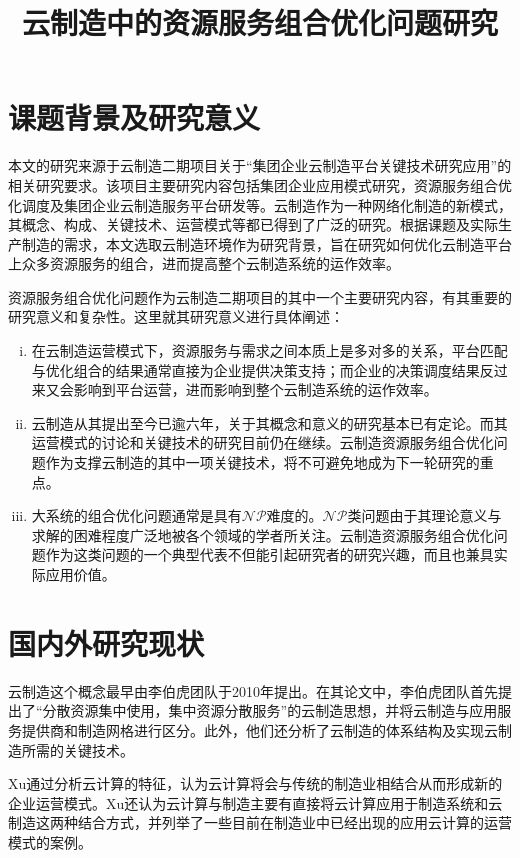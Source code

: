 \documentclass[UTF8]{ctexart}
\title{云制造中的资源服务组合优化问题研究}
\begin{document}
\maketitle
\section{课题背景及研究意义}
\label{background}
本文的研究来源于云制造二期项目关于“集团企业云制造平台关键技术研究应用”的相关研究要求。该项目主要研究内容包括集团企业应用模式研究，资源服务组合优化调度及集团企业云制造服务平台研发等。云制造作为一种网络化制造的新模式，其概念、构成、关键技术、运营模式等都已得到了广泛的研究。根据课题及实际生产制造的需求，本文选取云制造环境作为研究背景，旨在研究如何优化云制造平台上众多资源服务的组合，进而提高整个云制造系统的运作效率。

资源服务组合优化问题作为云制造二期项目的其中一个主要研究内容，有其重要的研究意义和复杂性。这里就其研究意义进行具体阐述：
\begin{enumerate}[(i)]
\item 在云制造运营模式下，资源服务与需求之间本质上是多对多的关系，平台匹配与优化组合的结果通常直接为企业提供决策支持；而企业的决策调度结果反过来又会影响到平台运营，进而影响到整个云制造系统的运作效率。
\item 云制造从其提出至今已逾六年，关于其概念和意义的研究基本已有定论。而其运营模式的讨论和关键技术的研究目前仍在继续。云制造资源服务组合优化问题作为支撑云制造的其中一项关键技术，将不可避免地成为下一轮研究的重点。
\item 大系统的组合优化问题通常是具有$\mathcal{NP}$难度的。$\mathcal{NP}$类问题由于其理论意义与求解的困难程度广泛地被各个领域的学者所关注。云制造资源服务组合优化问题作为这类问题的一个典型代表不但能引起研究者的研究兴趣，而且也兼具实际应用价值。
\end{enumerate}

\section{国内外研究现状}
\label{present research situation}
云制造这个概念最早由李伯虎团队\cite{LiBohu2010}于2010年提出。在其论文中，李伯虎团队首先提出了“分散资源集中使用，集中资源分散服务”的云制造思想，并将云制造与应用服务提供商和制造网格进行区分。此外，他们还分析了云制造的体系结构及实现云制造所需的关键技术。

Xu\cite{Xu2012}通过分析云计算的特征，认为云计算将会与传统的制造业相结合从而形成新的企业运营模式。Xu还认为云计算与制造主要有直接将云计算应用于制造系统和云制造这两种结合方式，并列举了一些目前在制造业中已经出现的应用云计算的运营模式的案例。
\end{document}
